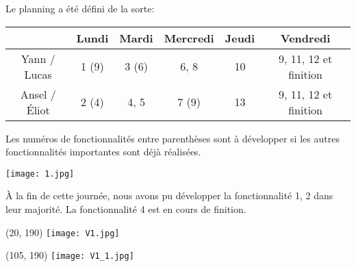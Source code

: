 \clearpage
Le planning a été défini de la sorte:\\

\begin{tabular}{|c|c|c|c|c|c|}
	\hline
	 					& Lundi 	& Mardi 	& Mercredi 		& Jeudi 	& Vendredi\\
	 \hline
		Yann / Lucas 	& 1 (9) 	& 3 (6) 	& 6, 8 			& 10 		& 9, 11, 12 et finition\\
		Ansel / Éliot 	& 2 (4) 	& 4, 5 		& 7 (9) 		& 13 		& 9, 11, 12 et finition\\
	\hline
\end{tabular}

Les numéros de fonctionnalités entre parenthèses sont à développer si les autres fonctionnalités importantes sont déjà réalisées.


\begin{center}
	\texttt{[image: 1.jpg]}
\end{center}

À la fin de cette journée, nous avons pu développer la fonctionnalité 1, 2 dans leur majorité. La fonctionnalité 4 est en cours de finition.


\begin{textblock}{0}(20, 190)
	\texttt{[image: V1.jpg]}
\end{textblock}

\begin{textblock}{0}(105, 190)
	\texttt{[image: V1\_1.jpg]}
\end{textblock}